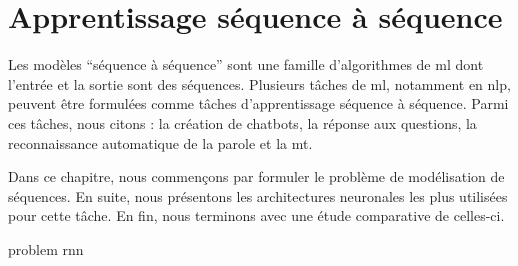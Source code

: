 \chapter{Apprentissage séquence à séquence}

Les modèles ``séquence à séquence'' sont une famille d'algorithmes de \acrfull{ml}
dont l'entrée et la sortie sont des séquences.
Plusieurs tâches de \acrlong{ml}, notamment en \acrfull{nlp}, 
peuvent être formulées comme tâches d'apprentissage séquence à séquence.
Parmi ces tâches, nous citons : la création de chatbots, la réponse aux questions, 
la reconnaissance automatique de la parole et la \acrlong{mt}.

Dans ce chapitre, nous commençons par formuler le problème de modélisation de séquences.
En suite, nous présentons les architectures neuronales les plus utilisées pour cette tâche.
En fin, nous terminons avec une étude comparative de celles-ci.

{problem}
{rnn}

